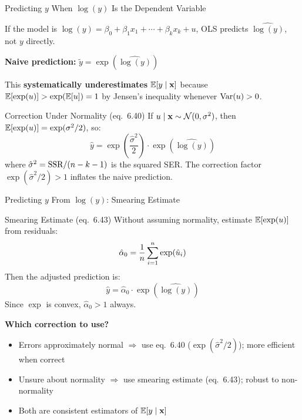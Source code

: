 \documentclass[aspectratio=169, 12pt]{beamer}
\begin{document}
\begin{frame}[shrink=8]{Predicting $y$ When $\log(y)$ Is the Dependent Variable}

  If the model is $\log(y) = \beta_0 + \beta_1 x_1 + \cdots + \beta_k x_k + u$,
  OLS predicts $\widehat{\log(y)}$, not $y$ directly.

  \medskip

  \textbf{Naive prediction:} $\tilde{y} = \exp(\widehat{\log(y)})$

  \medskip

  \begin{keybox}
    This \textbf{systematically underestimates} $\operatorname{\mathbb{E}}[y \mid \mathbf{x}]$
    because $\operatorname{\mathbb{E}}[\exp(u)] > \exp(\operatorname{\mathbb{E}}[u]) = 1$ by Jensen's inequality
    whenever $\operatorname{Var}(u) > 0$.
  \end{keybox}

  \medskip

  \begin{definitionbox}{Correction Under Normality (eq.\ 6.40)}
    If $u \mid \mathbf{x} \sim \mathcal{N}(0, \sigma^2)$, then
    $\operatorname{\mathbb{E}}[\exp(u)] = \exp(\sigma^2/2)$, so:
    \[
      \hat{y} = \exp\!\left(\frac{\hat\sigma^2}{2}\right) \cdot \exp\!\left(\widehat{\log(y)}\right)
    \]
    where $\hat\sigma^2 = \text{SSR}/(n - k - 1)$ is the squared SER.
    The correction factor $\exp(\hat\sigma^2/2) > 1$ inflates the naive prediction.
  \end{definitionbox}

\end{frame}

\begin{frame}[shrink=8]{Predicting $y$ From $\log(y)$: Smearing Estimate}

  \begin{definitionbox}{Smearing Estimate (eq.\ 6.43)}
    Without assuming normality, estimate $\operatorname{\mathbb{E}}[\exp(u)]$ from residuals:
    \[
      \hat\alpha_0 = \frac{1}{n} \sum_{i=1}^{n} \exp(\hat{u}_i)
    \]
    Then the adjusted prediction is:
    \[
      \hat{y} = \hat\alpha_0 \cdot \exp\!\left(\widehat{\log(y)}\right)
    \]
    Since $\exp$ is convex, $\hat\alpha_0 > 1$ always.
  \end{definitionbox}

  \medskip

  \begin{keybox}
    \textbf{Which correction to use?}
    \begin{itemize}
      \item Errors approximately normal $\Rightarrow$ use eq.\ 6.40
            ($\exp(\hat\sigma^2/2)$); more efficient when correct
      \item Unsure about normality $\Rightarrow$ use smearing estimate (eq.\ 6.43);
            robust to non-normality
      \item Both are consistent estimators of $\operatorname{\mathbb{E}}[y \mid \mathbf{x}]$
    \end{itemize}
  \end{keybox}

\end{frame}
\end{document}
